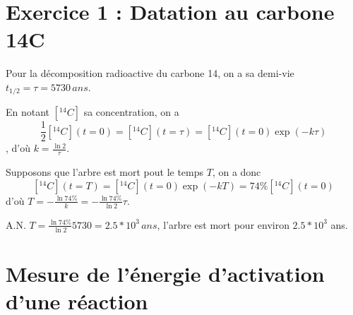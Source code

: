 \documentclass[a4paper,12pt]{book}
\begin{document}
\renewcommand{\labelitemi}{$\blacktriangleright$}
\renewcommand{\labelitemii}{$\bullet$}


\section{Exercice 1 : Datation au carbone 14C}
Pour la décomposition radioactive du carbone 14, on a sa demi-vie $t_{1/2}=\tau=5730\,ans$. 

En notant $[^{14}C]$ sa concentration, on a $$\frac{1}{2}[^{14}C](t=0)=[^{14}C](t=\tau)=[^{14}C](t=0)\exp(-k\tau)$$, 
d'où $k=\frac{\ln2}{\tau}$. 

Supposons que l'arbre est mort pout le temps $T$, on a donc 
$$
[^{14}C](t=T)=[^{14}C](t=0)\exp(-kT)=74\%[^{14}C](t=0)
$$
d'où $\boxed{T=-\frac{\ln74\%}{k}=-\frac{\ln74\%}{\ln2}\tau}$. 

A.N. $\boxed{T=\frac{\ln74\%}{\ln2}5730=2.5*10^3\,ans}$, l'arbre est mort pour environ $2.5*10^3$ ans.





\section{Mesure de l’énergie d’activation d’une réaction}
\end{document}
